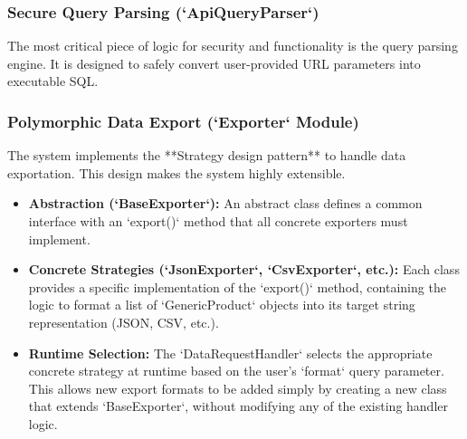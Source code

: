 \documentclass[12pt, a4paper]{report}
\begin{document}
\subsubsection{Secure Query Parsing (`ApiQueryParser`)}
The most critical piece of logic for security and functionality is the query parsing engine. It is designed to safely convert user-provided URL parameters into executable SQL.

\subsubsection{Polymorphic Data Export (`Exporter` Module)}
The system implements the **Strategy design pattern** to handle data exportation. This design makes the system highly extensible.
\begin{itemize}
    \item \textbf{Abstraction (`BaseExporter`):} An abstract class defines a common interface with an `export()` method that all concrete exporters must implement.
    \item \textbf{Concrete Strategies (`JsonExporter`, `CsvExporter`, etc.):} Each class provides a specific implementation of the `export()` method, containing the logic to format a list of `GenericProduct` objects into its target string representation (JSON, CSV, etc.).
    \item \textbf{Runtime Selection:} The `DataRequestHandler` selects the appropriate concrete strategy at runtime based on the user's `format` query parameter. This allows new export formats to be added simply by creating a new class that extends `BaseExporter`, without modifying any of the existing handler logic.
\end{itemize}
\end{document}
